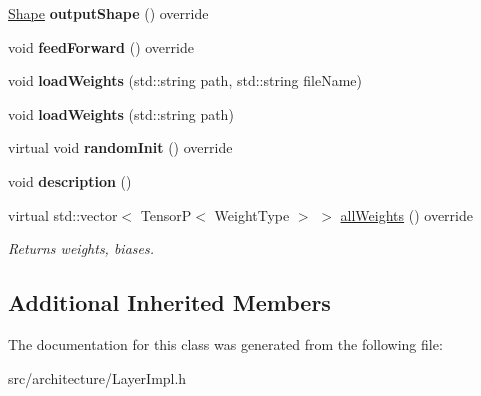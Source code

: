 \begin{DoxyCompactItemize}
\mbox{\label{classDense_a085651662d9c97063d5ef89956b03496}} 
\hyperlink{classShape}{Shape} {\bfseries output\+Shape} () override
\item 
\mbox{\label{classDense_a4e443f667dc72bb595f85e7af3f3a7aa}} 
void {\bfseries feed\+Forward} () override
\item 
\mbox{\label{classDense_a6254c14c1bce21c5c1905388642160cf}} 
void {\bfseries load\+Weights} (std\+::string path, std\+::string file\+Name)
\item 
\mbox{\label{classDense_a503236232088bef7f7f4ed2902c8e32d}} 
void {\bfseries load\+Weights} (std\+::string path)
\item 
\mbox{\label{classDense_a6a71e42b57250b30277d3a372eeae366}} 
virtual void {\bfseries random\+Init} () override
\item 
\mbox{\label{classDense_aa21053ebb51564c7761b433bcb0e9006}} 
void {\bfseries description} ()
\item 
\mbox{\label{classDense_a03631983df825324bdf4b5e57a23bbbf}} 
virtual std\+::vector$<$ TensorP$<$ Weight\+Type $>$ $>$ \hyperlink{classDense_a03631983df825324bdf4b5e57a23bbbf}{all\+Weights} () override
\begin{DoxyCompactList}\small\item\em Returns weights, biases. \end{DoxyCompactList}\end{DoxyCompactItemize}
\subsection*{Additional Inherited Members}


The documentation for this class was generated from the following file\+:\begin{DoxyCompactItemize}
\item 
src/architecture/Layer\+Impl.\+h\end{DoxyCompactItemize}
